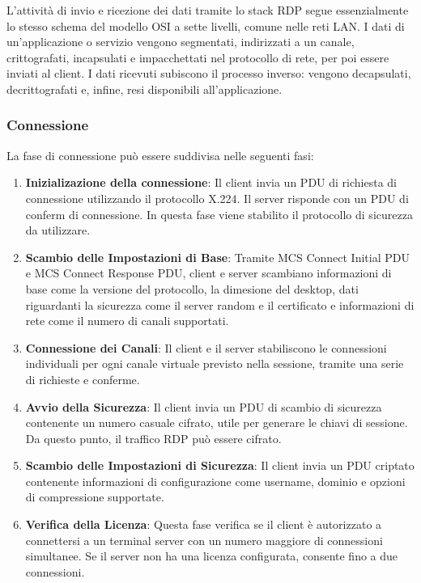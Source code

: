 \documentclass[12pt,a4paper,openright,twoside]{book}
\begin{document}
L'attività di invio e ricezione dei dati tramite lo stack \ac{RDP} segue essenzialmente lo stesso schema del modello OSI a sette livelli,
comune nelle reti \ac{LAN}.
%
I dati di un'applicazione o servizio vengono segmentati,
indirizzati a un canale, crittografati,
incapsulati e impacchettati nel protocollo di rete, per poi essere inviati al client.
%
I dati ricevuti subiscono il processo inverso: vengono decapsulati, decrittografati e, infine, resi disponibili all'applicazione.

\subsubsection{Connessione}

La fase di connessione può essere suddivisa nelle seguenti fasi:
\begin{enumerate}
    \item \textbf{Inizializazione della connessione}: Il client invia un \ac{PDU} di richiesta di connessione utilizzando il protocollo X.224. Il server risponde con un \ac{PDU} di conferm di connessione.
    In questa fase viene stabilito il protocollo di sicurezza da utilizzare.
    \item \textbf{Scambio delle Impostazioni di Base}: Tramite MCS Connect Initial \ac{PDU} e MCS Connect Response \ac{PDU},
    client e server scambiano informazioni di base come la versione del protocollo, la dimesione del desktop,
    dati riguardanti la sicurezza come il server random e il certificato e informazioni di rete come il numero di canali supportati.
    \item \textbf{Connessione dei Canali}: Il client e il server stabiliscono le connessioni individuali per ogni canale virtuale previsto nella sessione,
    tramite una serie di richieste e conferme.
    \item \textbf{Avvio della Sicurezza}: Il client invia un \ac{PDU} di scambio di sicurezza contenente un numero casuale cifrato, utile per generare le chiavi di sessione.
    Da questo punto, il traffico \ac{RDP} può essere cifrato.
    \item \textbf{Scambio delle Impostazioni di Sicurezza}: Il client invia un \ac{PDU} criptato contenente informazioni di configurazione come username,
    dominio e opzioni di compressione supportate.
    \item \textbf{Verifica della Licenza}: Questa fase verifica se il client è autorizzato a connettersi a un terminal server con un numero maggiore di connessioni simultanee.
    Se il server non ha una licenza configurata, consente fino a due connessioni.

\end{enumerate}
\end{document}
